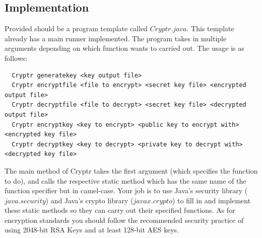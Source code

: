 \documentclass{article}
\begin{document}
\subsection*{Implementation}
Provided should be a program template called $Cryptr.java$. This template already has a main runner implemented. The program takes in multiple arguments depending on which function wants to carried out. The usage is as follows:

\begin{verbatim}
  Cryptr generatekey <key output file>
  Cryptr encryptfile <file to encrypt> <secret key file> <encrypted output file>
  Cryptr decryptfile <file to decrypt> <secret key file> <decrypted output file>
  Cryptr encryptkey <key to encrypt> <public key to encrypt with> <encrypted key file>
  Cryptr decryptkey <key to decrypt> <private key to decrypt with> <decrypted key file>
\end{verbatim}

\noindent The main method of Cryptr takes the first argument (which specifies the function to do), and calls the respective static method which has the same name of the function specifier but in camel-case. Your job is to use Java's security library ($java.security$) and Java's crypto library ($javax.crypto$) to fill in and implement these static methods so they can carry out their specified functions. As for encryption standards you should follow the recommended security practice of using 2048-bit RSA Keys and at least 128-bit AES keys.
\end{document}
